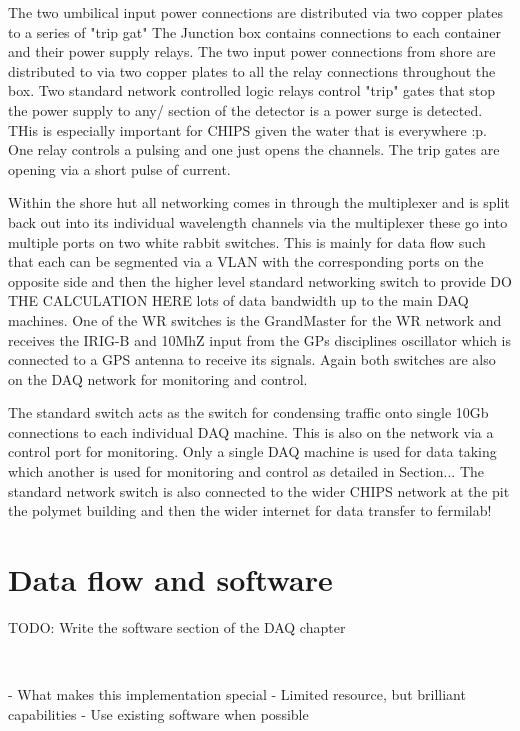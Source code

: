 The two umbilical input power connections are distributed via two copper plates to a series of
"trip gat" The Junction box contains connections to each container and their power supply relays.
The two input power connections from shore are distributed to via two copper plates to all the
relay connections throughout the box. Two standard network controlled logic relays control "trip"
gates that stop the power supply to any/ section of the detector is a power surge is detected.
THis is especially important for CHIPS given the water that is everywhere :p. One relay controls a
pulsing and one just opens the channels. The trip gates are opening via a short pulse of current.

Within the shore hut all networking comes in through the multiplexer and is split back out into
its individual wavelength channels via the multiplexer these go into multiple ports on two white
rabbit switches. This is mainly for data flow such that each can be segmented via a VLAN with the
corresponding ports on the opposite side and then the higher level standard networking switch to
provide DO THE CALCULATION HERE lots of data bandwidth up to the main DAQ machines. One of the WR
switches is the GrandMaster for the WR network and receives the IRIG-B and 10MhZ input from the
GPs disciplines oscillator which is connected to a GPS antenna to receive its signals. Again both
switches are also on the DAQ network for monitoring and control.

The standard switch acts as the switch for condensing traffic onto single 10Gb connections to each
individual DAQ machine. This is also on the network via a control port for monitoring. Only a
single DAQ machine is used for data taking which another is used for monitoring and control as
detailed in Section... The standard network switch is also connected to the wider CHIPS network at
the pit the polymet building and then the wider internet for data transfer to fermilab!

\section{Data flow and software} %
\label{sec:daq_soft} %

TODO: Write the software section of the DAQ chapter

~\cite{chipsdaq2020}

- What makes this implementation special
- Limited resource, but brilliant capabilities
- Use existing software when possible

